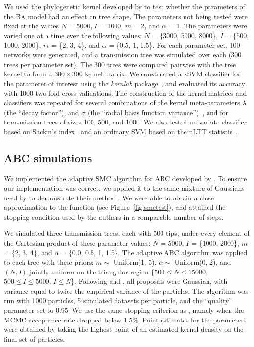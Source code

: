\documentclass[12pt]{article}\usepackage[]{graphicx}\usepackage[]{color}
\newcommand{\software}[1]{\textit{#1}}
\newcommand{\sett}[1]{\{#1\}}
\begin{document}
We used the phylogenetic kernel developed by \textcite{poon2013mapping} to test
whether the parameters of the \gls{BA} model had an effect on tree shape. The
parameters not being tested were fixed at the values $N$ = 5000, $I$ = 1000,
$m$ = 2, and $\alpha$ = 1. The parameters were varied one at a time over the
following values: $N$ = \sett{3000, 5000, 8000}, $I$ = \sett{500, 1000, 2000},
$m$ = \sett{2, 3, 4}, and $\alpha$ = \sett{0.5, 1, 1.5}. For each parameter
set, 100 networks were generated, and a transmission tree was simulated over
each (300 trees per parameter set). The 300 trees were compared pairwise with
the tree kernel to form a $300 \times 300$ kernel matrix. We constructed a
\gls{kSVM} classifier for the parameter of interest using the
\software{kernlab} package~\autocite{karatzoglou2004kernlab}, and evaluated its
accuracy with 1000 two-fold cross-validations. The construction of the kernel
matrices and classifiers was repeated for several combinations of the kernel
meta-parameters $\lambda$ (the ``decay factor''), and $\sigma$ (the ``radial
basis function variance'')~\autocite[see][]{poon2013mapping}, and for
transmission trees of sizes 100, 500, and 1000. We also tested univariate
classifier based on Sackin's index~\autocite{shao1990tree} and an ordinary SVM
based on the \gls{nLTT} statistic~\autocite{janzen2015approximate}.

\subsection*{ABC simulations}

We implemented the adaptive \gls{SMC} algorithm for \gls{ABC} developed by
\textcite{del2012adaptive}. To ensure our implementation was correct, we
applied it to the same mixture of Gaussians used by
\citeauthor{del2012adaptive} to demonstrate their method \autocite[originally
used by][]{sisson2007sequential}. We were able to obtain a close approximation
to the function (see Figure~\ref{fig:smctest}), and attained the stopping
condition used by the authors in a comparable number of steps.

We simulated three transmission trees, each with 500 tips, under every element
of the Cartesian product of these parameter values: $N$ = 5000, $I$ =
\sett{1000, 2000}, $m$ = \sett{2, 3, 4}, and $\alpha$ = \sett{0.0, 0.5, 1, 1.5}.
The adaptive \gls{ABC} algorithm was applied to each tree with these priors:
$m \sim$ Uniform(1, 5), $\alpha \sim$ Uniform(0, 2), and $(N, I)$ jointly
uniform on the triangular region \{$500 \leq N \leq 15000$, $500 \leq I \leq
 5000$, $I \leq N$\}. Following \textcite{del2012adaptive} and
\textcite{beaumont2009adaptive}, all proposals were Gaussian, with variance
equal to twice the empirical variance of the particles. The algorithm was run
with 1000 particles, 5 simulated datasets per particle, and the ``quality''
parameter set to 0.95. We use the same stopping criterion as
\textcite{del2012adaptive}, namely when the MCMC acceptance rate dropped below
1.5\%. Point estimates for the parameters were obtained by taking the highest
point of an estimated kernel density on the final set of particles.
\end{document}
